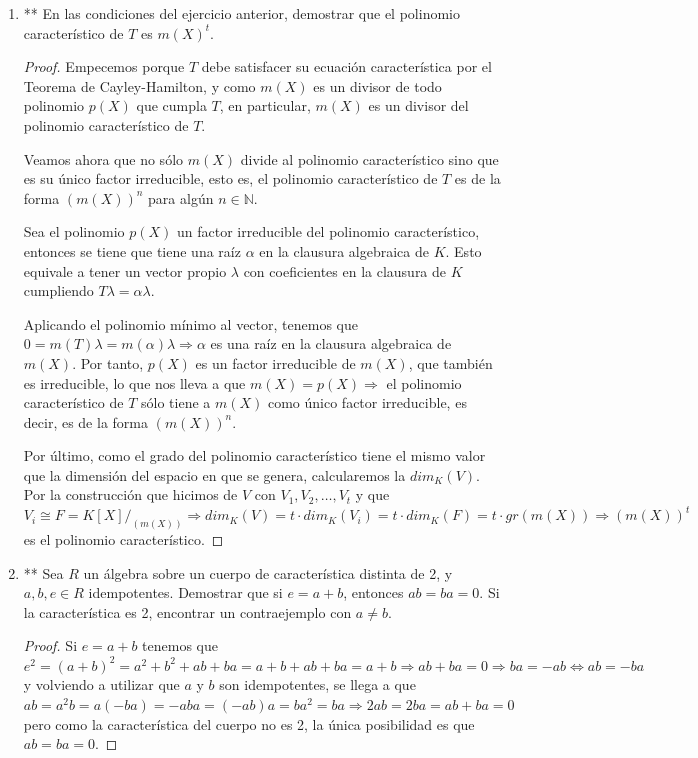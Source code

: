 \documentclass[paper=a4, fontsize=11pt, spanish]{scrartcl}
\begin{document}
\begin{enumerate}
		\item ** En las condiciones del ejercicio anterior, demostrar que el polinomio característico de $T$ es
		$m(X)^t$.
		\begin{proof}
			Empecemos porque $T$ debe satisfacer su ecuación característica por el Teorema de Cayley-Hamilton,
			y como $m(X)$ es un divisor de todo polinomio $p(X)$ que cumpla $T$, en particular, $m(X)$ es un
			divisor del polinomio característico de $T$.
			
			Veamos ahora que no sólo $m(X)$ divide al polinomio característico sino que es su único factor
			irreducible, esto es, el polinomio característico de $T$ es de la forma $(m(X))^n$ para algún $n
			\in \mathbb{N}$.
			
			Sea el polinomio $p(X)$ un factor irreducible del polinomio característico, entonces se tiene que
			tiene una raíz $\alpha$ en la clausura algebraica de $K$. Esto equivale a tener un vector propio
			$\lambda$ con coeficientes en la clausura de $K$ cumpliendo $T\lambda = \alpha\lambda$.
			
			Aplicando el polinomio mínimo al vector, tenemos que $0 = m(T)\lambda = m(\alpha)\lambda \Rightarrow
			\alpha$ es una raíz en la clausura algebraica de $m(X)$. Por tanto, $p(X)$ es un factor irreducible
			de $m(X)$, que también es irreducible, lo que nos lleva a que $m(X) = p(X) \Rightarrow$ el polinomio
			característico de $T$ sólo tiene a $m(X)$ como único factor irreducible, es decir, es de la forma
			$(m(X))^n$.
			
			Por último, como el grado del polinomio característico tiene el mismo valor que la dimensión del
			espacio en que se genera, calcularemos la $dim_K(V)$. Por la construcción que hicimos de $V$ con
			$V_1, V_2, \dots, V_t$ y que $V_i \cong F = K[X]/_{(m(X))} \Rightarrow dim_K(V) = t \cdot dim_K (V_i)
			= t \cdot dim_K(F) = t \cdot gr(m(X)) \Rightarrow (m(X))^t$ es el polinomio característico.
		\end{proof}
		
		\item ** Sea $R$ un álgebra sobre un cuerpo de característica distinta de 2, y $a, b, e \in R$
		idempotentes. Demostrar que si $e = a + b$, entonces $ab = ba = 0$. Si la característica es 2,
		encontrar un contraejemplo con $a \neq b$.
		\begin{proof}
			Si $e = a+b$ tenemos que $e^2 = (a+b)^2 = a^2 + b^2 + ab + ba = a + b + ab + ba = a+b \Rightarrow
			ab + ba = 0 \Rightarrow ba = -ab \Leftrightarrow ab = -ba$ y volviendo a utilizar que $a$ y $b$ son
			idempotentes, se llega a que $ab = a^2b = a(-ba) = -aba = (-ab)a = ba^2 = ba \Rightarrow 2ab = 2ba
			= ab + ba = 0$ pero como la característica del cuerpo no es 2, la única posibilidad es que $ab = ba
			= 0$.
			

\end{proof}
\end{enumerate}
\end{document}
